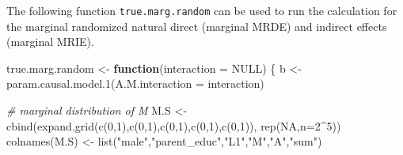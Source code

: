 \documentclass[
]{book}
\newenvironment{Shaded}{\begin{snugshade}}{\end{snugshade}}
\newcommand{\AttributeTok}[1]{\textcolor[rgb]{0.77,0.63,0.00}{#1}}
\newcommand{\CommentTok}[1]{\textcolor[rgb]{0.56,0.35,0.01}{\textit{#1}}}
\newcommand{\ConstantTok}[1]{\textcolor[rgb]{0.00,0.00,0.00}{#1}}
\newcommand{\ControlFlowTok}[1]{\textcolor[rgb]{0.13,0.29,0.53}{\textbf{#1}}}
\newcommand{\DecValTok}[1]{\textcolor[rgb]{0.00,0.00,0.81}{#1}}
\newcommand{\FunctionTok}[1]{\textcolor[rgb]{0.00,0.00,0.00}{#1}}
\newcommand{\NormalTok}[1]{#1}
\newcommand{\OtherTok}[1]{\textcolor[rgb]{0.56,0.35,0.01}{#1}}
\newcommand{\SpecialCharTok}[1]{\textcolor[rgb]{0.00,0.00,0.00}{#1}}
\newcommand{\StringTok}[1]{\textcolor[rgb]{0.31,0.60,0.02}{#1}}
\begin{document}
The following function \texttt{true.marg.random} can be used to run the calculation for the marginal randomized natural direct (marginal MRDE) and indirect effects (marginal MRIE).

\begin{Shaded}
\begin{Highlighting}[]
\NormalTok{true.marg.random }\OtherTok{\textless{}{-}} \ControlFlowTok{function}\NormalTok{(}\AttributeTok{interaction =} \ConstantTok{NULL}\NormalTok{) \{}
\NormalTok{  b }\OtherTok{\textless{}{-}} \FunctionTok{param.causal.model.1}\NormalTok{(}\AttributeTok{A.M.interaction =}\NormalTok{ interaction)}
  
  \CommentTok{\# marginal distribution of M}
\NormalTok{  M.S }\OtherTok{\textless{}{-}} \FunctionTok{cbind}\NormalTok{(}\FunctionTok{expand.grid}\NormalTok{(}\FunctionTok{c}\NormalTok{(}\DecValTok{0}\NormalTok{,}\DecValTok{1}\NormalTok{),}\FunctionTok{c}\NormalTok{(}\DecValTok{0}\NormalTok{,}\DecValTok{1}\NormalTok{),}\FunctionTok{c}\NormalTok{(}\DecValTok{0}\NormalTok{,}\DecValTok{1}\NormalTok{),}\FunctionTok{c}\NormalTok{(}\DecValTok{0}\NormalTok{,}\DecValTok{1}\NormalTok{),}\FunctionTok{c}\NormalTok{(}\DecValTok{0}\NormalTok{,}\DecValTok{1}\NormalTok{)), }\FunctionTok{rep}\NormalTok{(}\ConstantTok{NA}\NormalTok{,}\AttributeTok{n=}\DecValTok{2}\SpecialCharTok{\^{}}\DecValTok{5}\NormalTok{))}
  \FunctionTok{colnames}\NormalTok{(M.S) }\OtherTok{\textless{}{-}} \FunctionTok{list}\NormalTok{(}\StringTok{"male"}\NormalTok{,}\StringTok{"parent\_educ"}\NormalTok{,}\StringTok{"L1"}\NormalTok{,}\StringTok{"M"}\NormalTok{,}\StringTok{"A"}\NormalTok{,}\StringTok{"sum"}\NormalTok{)}
  

\end{Highlighting}
\end{Shaded}
\end{document}
